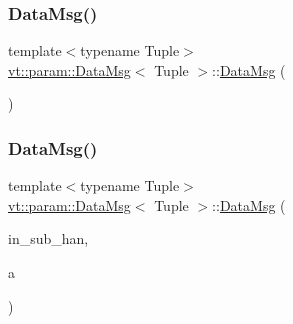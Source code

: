 \subsubsection{\texorpdfstring{Data\+Msg()}{DataMsg()}\hspace{0.1cm}{\footnotesize\ttfamily [1/3]}}
{\footnotesize\ttfamily template$<$typename Tuple$>$ \\
\hyperlink{structvt_1_1param_1_1_data_msg}{vt\+::param\+::\+Data\+Msg}$<$ Tuple $>$\+::\hyperlink{structvt_1_1param_1_1_data_msg}{Data\+Msg} (\begin{DoxyParamCaption}{ }\end{DoxyParamCaption})\hspace{0.3cm}{\ttfamily [default]}}

\mbox{\label{structvt_1_1param_1_1_data_msg_a288b473f5006d335c443d61e1e749d25}} 
\subsubsection{\texorpdfstring{Data\+Msg()}{DataMsg()}\hspace{0.1cm}{\footnotesize\ttfamily [2/3]}}
{\footnotesize\ttfamily template$<$typename Tuple$>$ \\
\hyperlink{structvt_1_1param_1_1_data_msg}{vt\+::param\+::\+Data\+Msg}$<$ Tuple $>$\+::\hyperlink{structvt_1_1param_1_1_data_msg}{Data\+Msg} (\begin{DoxyParamCaption}\item[{\hyperlink{namespacevt_af64846b57dfcaf104da3ef6967917573}{Handler\+Type} const}]{in\+\_\+sub\+\_\+han,  }\item[{Tuple \&\&}]{a }\end{DoxyParamCaption})\hspace{0.3cm}{\ttfamily [inline]}}

\mbox{\label{structvt_1_1param_1_1_data_msg_affab552cda088a887071d4dc3e4236c3}} 
